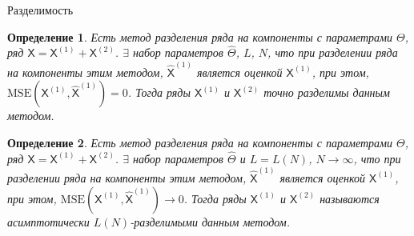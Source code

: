 \documentclass[notheorems, handout]{beamer}
\newtheorem{definition}{Определение}
\newcommand{\TS}{\mathsf{X}}
\begin{document}
	\begin{frame}{Разделимость}
		\begin{definition}
			\label{def:exact}
			Есть метод разделения ряда на компоненты с параметрами \( \Theta \), ряд \( \TS = \TS^{(1)} + \TS^{(2)} \). $\exists$ набор параметров \( \hat{\Theta} \), \( L \), \( N\), что при разделении ряда на компоненты этим методом, \( \hat{\TS}^{(1)} \) является оценкой \( \TS^{(1)} \), при этом, \( \mathrm{MSE}\left(\TS^{(1)}, \hat{\TS}^{(1)}\right) = 0 \). Тогда ряды \( \TS^{(1)} \) и \( \TS^{(2)} \) точно разделимы данным методом.
		\end{definition}
		\begin{definition}
			\label{def:asymp}
			Есть метод разделения ряда на компоненты с параметрами \( \Theta \), ряд \( \TS = \TS^{(1)} + \TS^{(2)} \). $\exists$ набор параметров \( \hat{\Theta} \) и \( L = L(N) \), \( N \rightarrow \infty \), что при разделении ряда на компоненты этим методом, \( \hat{\TS}^{(1)} \) является оценкой \( \TS^{(1)} \), при этом, \( \mathrm{MSE}\left(\TS^{(1)}, \hat{\TS}^{(1)}\right) \rightarrow 0 \). Тогда ряды \( \TS^{(1)} \) и \( \TS^{(2)} \) называются асимптотически \( L(N) \)-разделимыми данным методом.
		\end{definition}

	\end{frame}
	
	
	
\end{document}
